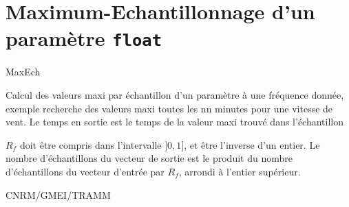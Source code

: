 %
\section{Maximum-Echantillonnage d'un param\`etre {\tt float}}

 {\sf MaxEch}

Calcul des valeurs maxi par \'echantillon d'un
param\`etre \`a une fr\'equence donn\'ee, exemple
recherche des valeurs maxi toutes les nn minutes
pour une vitesse de vent.
Le temps en sortie est le temps de la valeur maxi
trouv\'e dans l'\'echantillon

\bigskip






$R_f$ doit \^etre compris dans l'intervalle $]0, 1]$,
et \^etre l'inverse d'un entier. \newline
Le nombre d'\'echantillons du vecteur de sortie est le produit du
nombre d'\'echantillons du vecteur d'entr\'ee par $R_f$, arrondi
\`a l'entier sup\'erieur.


CNRM/GMEI/TRAMM

